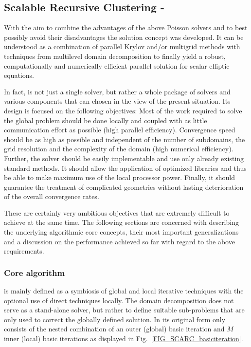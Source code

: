 \subsection{Scalable Recursive Clustering - \scarc{}} 
\label{SEC_SCARC_scarc}
  
With the aim to combine the advantages of the above Poisson solvers and to best possibly avoid their disadvantages the solution concept \scarc{} was developed. It can be understood as a combination of parallel Krylov and/or multigrid methods with techniques from multilevel domain decomposition to finally yield a robust, computationally and numerically efficient parallel solution for scalar elliptic equations. 

In fact, \scarc{} is not just a single solver, but rather a whole package of solvers and various components that can chosen in the view of the present situation. Its
design is focused on the following objectives: Most of the work required to solve the global problem should be done locally and coupled with as little communication effort as possible (high parallel efficiency). Convergence speed should be as high as possible and independent of the number of subdomains, the grid resolution and the complexity of the domain (high numerical efficiency). Further, the solver should be easily implementable and use only already existing standard methods. It should allow the application of optimized libraries and thus be able to make maximum use of the local processor power. Finally, it should guarantee the treatment of complicated geometries without lasting deterioration of the overall convergence rates. 

These are certainly very ambitious objectives that are extremely difficult to achieve at the same time. 
The following sections are concerned with describing the underlying algorithmic core concepts, their most important generalizations and a discussion on the performance achieved so far with regard to the above requirements.


\subsubsection{Core algorithm}
\scarc{} is mainly defined as a symbiosis of global and local iterative techniques with the optional use of direct techniques locally. 
The domain decomposition does not serve as a stand-alone solver, but rather to define suitable sub-problems that are only used to correct the globally defined solution.
%
In its original form \scarc{} only consists of the
nested combination of an outer (global) basic iteration and $M$ inner (local) basic iterations as displayed in Fig.~\ref{FIG_SCARC_basiciteration}. 

